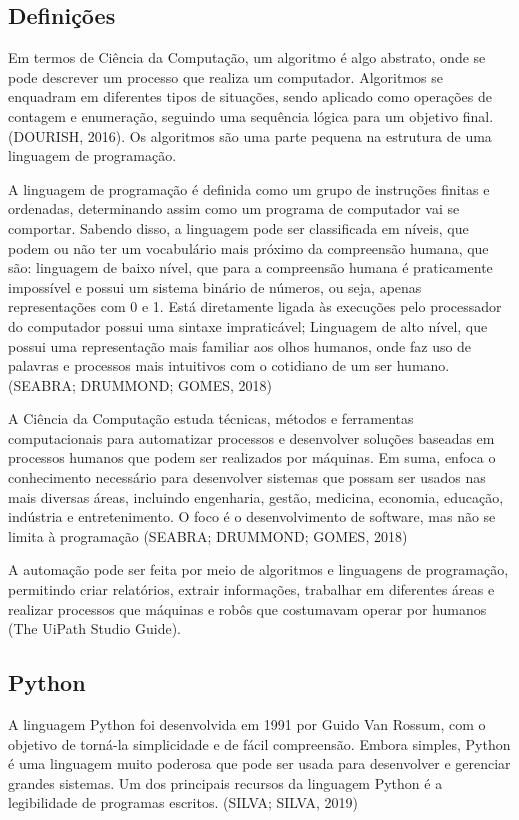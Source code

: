\documentclass[
	12pt,				%
	openright,			%
	twoside,			%
	a4paper,			%
	english,			%
	french,				%
	spanish,			%
	brazil				%
	]{abntex2}
\begin{document}
\subsection{Definições}

Em termos de Ciência da Computação, um algoritmo é algo abstrato, onde se pode descrever um processo que realiza um computador. Algoritmos se enquadram em diferentes tipos de situações, sendo aplicado como operações de contagem e enumeração, seguindo uma sequência lógica para um objetivo final. (DOURISH, 2016). Os algoritmos são uma parte pequena na estrutura de uma linguagem de programação.

A linguagem de programação é definida como um grupo de instruções finitas e ordenadas, determinando assim como um programa de computador vai se comportar. Sabendo disso, a linguagem pode ser classificada em níveis, que podem ou não ter um vocabulário mais próximo da compreensão humana, que são: linguagem de baixo nível, que para a compreensão humana é praticamente impossível e possui um sistema binário de números, ou seja, apenas representações com 0 e 1. Está diretamente ligada às execuções pelo processador do computador possui uma sintaxe impraticável; Linguagem de alto nível, que possui uma representação mais familiar aos olhos humanos, onde faz uso de palavras e processos mais intuitivos com o cotidiano de um ser humano. (SEABRA; DRUMMOND; GOMES, 2018)

A Ciência da Computação estuda técnicas, métodos e ferramentas computacionais para automatizar processos e desenvolver soluções baseadas em processos humanos que podem ser realizados por máquinas. Em suma, enfoca o conhecimento necessário para desenvolver sistemas que possam ser usados nas mais diversas áreas, incluindo engenharia, gestão, medicina, economia, educação, indústria e entretenimento. O foco é o desenvolvimento de software, mas não se limita à programação (SEABRA; DRUMMOND; GOMES, 2018)

A automação pode ser feita por meio de algoritmos e linguagens de programação, permitindo criar relatórios, extrair informações, trabalhar em diferentes áreas e realizar processos que máquinas e robôs que costumavam operar por humanos (The UiPath Studio Guide).


\subsection{Python}

A linguagem Python foi desenvolvida em 1991 por Guido Van Rossum, com o objetivo de torná-la simplicidade e de fácil compreensão. Embora simples, Python é uma linguagem muito poderosa que pode ser usada para desenvolver e gerenciar grandes sistemas. Um dos principais recursos da linguagem Python é a legibilidade de programas escritos. (SILVA; SILVA, 2019)
\end{document}
